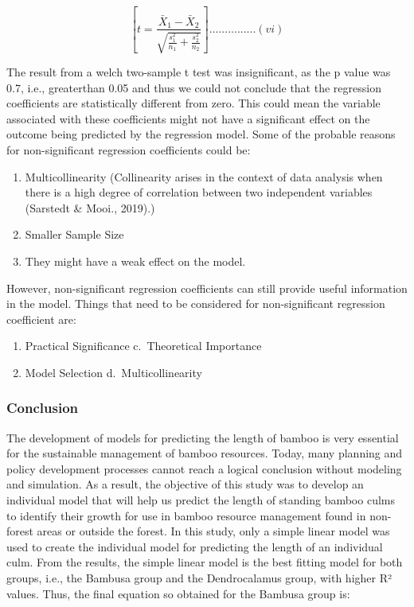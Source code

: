 \documentclass[preprint, 3p,
authoryear]{elsarticle} %
\begin{document}
\[[ t = \frac{{\bar{X}_1 - \bar{X}_2}}{{\sqrt{\frac{{s_1^2}}{{n_1}} + \frac{{s_2^2}}{{n_2}}}}} ]...............(vi) \]

The result from a welch two-sample t test was insignificant, as the p
value was 0.7, i.e., greaterthan 0.05 and thus we could not conclude
that the regression coefficients are statistically different from zero.
This could mean the variable associated with these coefficients might
not have a significant effect on the outcome being predicted by the
regression model. Some of the probable reasons for non-significant
regression coefficients could be:

\begin{enumerate}
\def\labelenumi{\alph{enumi})}
\item
  Multicollinearity (Collinearity arises in the context of data analysis
  when there is a high degree of correlation between two independent
  variables (Sarstedt \& Mooi., 2019).)
\item
  Smaller Sample Size
\item
  They might have a weak effect on the model.
\end{enumerate}

However, non-significant regression coefficients can still provide
useful information in the model. Things that need to be considered for
non-significant regression coefficient are:

\begin{enumerate}
\def\labelenumi{\alph{enumi}.}
\item
  Practical Significance c.~Theoretical Importance
\item
  Model Selection d.~Multicollinearity
\end{enumerate}

\hypertarget{conclusion}{%
\subsubsection{Conclusion}\label{conclusion}}

The development of models for predicting the length of bamboo is very
essential for the sustainable management of bamboo resources. Today,
many planning and policy development processes cannot reach a logical
conclusion without modeling and simulation. As a result, the objective
of this study was to develop an individual model that will help us
predict the length of standing bamboo culms to identify their growth for
use in bamboo resource management found in non-forest areas or outside
the forest. In this study, only a simple linear model was used to create
the individual model for predicting the length of an individual culm.
From the results, the simple linear model is the best fitting model for
both groups, i.e., the Bambusa group and the Dendrocalamus group, with
higher R² values. Thus, the final equation so obtained for the Bambusa
group is:
\end{document}

